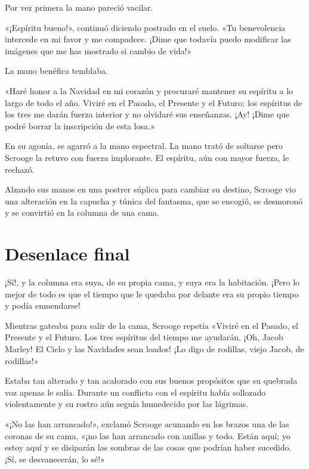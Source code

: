 \documentclass{novela}
\begin{document}
 Por vez primera la mano pareció vacilar.

 «¡Espíritu bueno!», continuó diciendo postrado en el suelo. «Tu benevolencia intercede en mi favor y me compadece. ¡Dime que todavía puedo modificar las imágenes que me has mostrado si cambio de vida!»

 La mano benéfica temblaba.

 «Haré honor a la Navidad en mi corazón y procuraré mantener su espíritu a lo largo de todo el año. Viviré en el Pasado, el Presente y el Futuro; los espíritus de los tres me darán fuerza interior y no olvidaré sus enseñanzas. ¡Ay! ¡Dime que podré borrar la inscripción de esta losa.»

 En su agonía, se agarró a la mano espectral. La mano trató de soltarse pero Scrooge la retuvo con fuerza implorante. El espíritu, aún con mayor fuerza, le rechazó.

 Alzando sus manos en una postrer súplica para cambiar su destino, Scrooge vio una alteración en la capucha y túnica del fantasma, que se encogió, se desmoronó y se convirtió en la columna de una cama.






 \chapter{Desenlace final}



 ¡Sí!, y la columna era suya, de su propia cama, y suya era la habitación. ¡Pero lo mejor de todo es que el tiempo que le quedaba por delante era su propio tiempo y podía enmendarse!

 Mientras gateaba para salir de la cama, Scrooge repetía «Viviré en el Pasado, el Presente y el Futuro. Los tres espíritus del tiempo me ayudarán. ¡Oh, Jacob Marley! El Cielo y las Navidades sean loados! ¡Lo digo de rodillas, viejo Jacob, de rodillas!»

 Estaba tan alterado y tan acalorado con sus buenos propósitos que su quebrada voz apenas le salía. Durante un conflicto con el espíritu había sollozado violentamente y su rostro aún seguía humedecido por las lágrimas.

 «¡No las han arrancado!», exclamó Scrooge acunando en los brazos una de las coronas de su cama, «¡no las han arrancado con anillas y todo. Están aquí; yo estoy aquí y se disiparán las sombras de las cosas que podrían haber sucedido. ¡Sí, se desvanecerán, lo sé!»
\end{document}
